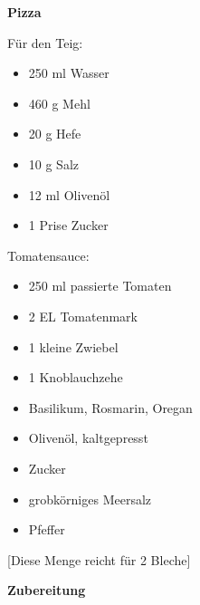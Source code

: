 
\parindent0pt	

\pagestyle{empty}


\textbf{{\LARGE Pizza}}

\hrulefill
\vspace*{\fill}
\begin{multicols}{2}	

Für den Teig:
\begin{itemize}
\item 250 ml Wasser
\item 460 g Mehl
\item 20 g Hefe
\item 10 g Salz
\item 12 ml Olivenöl
\item  1 Prise Zucker
\end{itemize}

Tomatensauce:
\begin{itemize}
\item 250 ml passierte Tomaten
\item 2 EL Tomatenmark
\item 1 kleine Zwiebel
\item 1 Knoblauchzehe
\item Basilikum, Rosmarin, Oregan
\item Olivenöl, kaltgepresst
\item Zucker
\item grobkörniges Meersalz
\item Pfeffer
\end{itemize}
\vfill									
\end{multicols}

\vspace{0.5 cm}			%
\begin{center}			%
[Diese Menge reicht für 2 Bleche]
\end{center}


\vfill
\newpage
\textbf{{\LARGE Zubereitung}}%

\hrulefill

